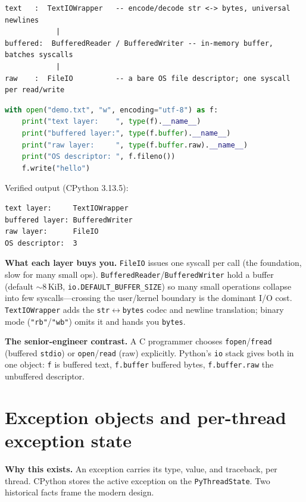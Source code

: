 \begin{lstlisting}[caption={The io layer stack}]
text   :  TextIOWrapper   -- encode/decode str <-> bytes, universal newlines
            |
buffered:  BufferedReader / BufferedWriter -- in-memory buffer, batches syscalls
            |
raw    :  FileIO          -- a bare OS file descriptor; one syscall per read/write
\end{lstlisting}

\begin{lstlisting}[language=Python, caption={open() builds a three-object stack; each layer is reachable.}]
with open("demo.txt", "w", encoding="utf-8") as f:
    print("text layer:    ", type(f).__name__)
    print("buffered layer:", type(f.buffer).__name__)
    print("raw layer:     ", type(f.buffer.raw).__name__)
    print("OS descriptor: ", f.fileno())
    f.write("hello")
\end{lstlisting}

Verified output (CPython 3.13.5):

\begin{lstlisting}[caption={Output}]
text layer:     TextIOWrapper
buffered layer: BufferedWriter
raw layer:      FileIO
OS descriptor:  3
\end{lstlisting}

\textbf{What each layer buys you.} \texttt{FileIO} issues one syscall per call (the foundation,
slow for many small ops). \texttt{BufferedReader}/\texttt{BufferedWriter} hold a buffer (default
$\sim$8\,KiB, \texttt{io.DEFAULT\_BUFFER\_SIZE}) so many small operations collapse into few
syscalls---crossing the user/kernel boundary is the dominant I/O cost. \texttt{TextIOWrapper}
adds the \texttt{str}$\leftrightarrow$\texttt{bytes} codec and newline translation; binary mode
(\texttt{"rb"}/\texttt{"wb"}) omits it and hands you \texttt{bytes}.

\textbf{The senior-engineer contrast.} A C programmer chooses \texttt{fopen}/\texttt{fread}
(buffered \texttt{stdio}) or \texttt{open}/\texttt{read} (raw) explicitly. Python's \texttt{io}
stack gives both in one object: \texttt{f} is buffered text, \texttt{f.buffer} buffered bytes,
\texttt{f.buffer.raw} the unbuffered descriptor.

\section{Exception objects and per-thread exception state}

\textbf{Why this exists.} An exception carries its type, value, and traceback, per thread.
CPython stores the active exception on the \texttt{PyThreadState}. Two historical facts frame the
modern design.

